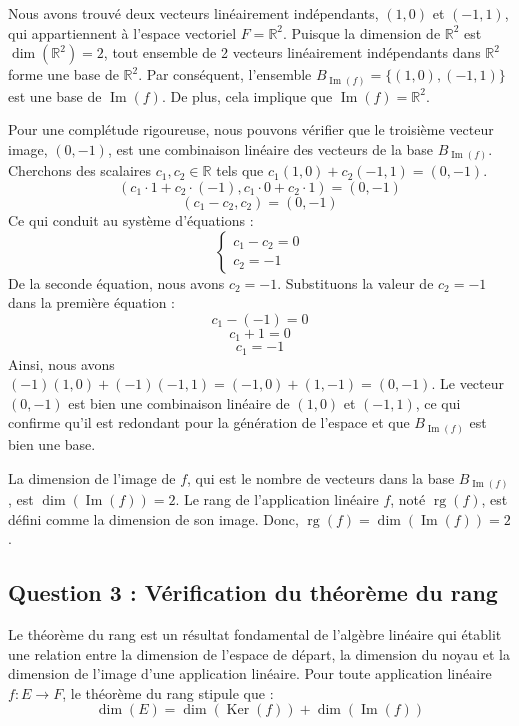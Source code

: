 \documentclass{report}
\begin{document}
Nous avons trouvé deux vecteurs linéairement indépendants, $(1,0)$ et $(-1,1)$, qui appartiennent à l'espace vectoriel $F = \mathbb{R}^2$.
Puisque la dimension de $\mathbb{R}^2$ est $\dim(\mathbb{R}^2) = 2$, tout ensemble de 2 vecteurs linéairement indépendants dans $\mathbb{R}^2$ forme une base de $\mathbb{R}^2$.
Par conséquent, l'ensemble $B_{\operatorname{Im}(f)} = \{ (1,0), (-1,1) \}$ est une base de $\operatorname{Im}(f)$.
De plus, cela implique que $\operatorname{Im}(f) = \mathbb{R}^2$.

Pour une complétude rigoureuse, nous pouvons vérifier que le troisième vecteur image, $(0,-1)$, est une combinaison linéaire des vecteurs de la base $B_{\operatorname{Im}(f)}$.
Cherchons des scalaires $c_1, c_2 \in \mathbb{R}$ tels que $c_1(1,0) + c_2(-1,1) = (0,-1)$.
$$ (c_1 \cdot 1 + c_2 \cdot (-1), c_1 \cdot 0 + c_2 \cdot 1) = (0,-1) $$
$$ (c_1 - c_2, c_2) = (0,-1) $$
Ce qui conduit au système d'équations :
$$ \begin{cases} c_1 - c_2 = 0 \\ c_2 = -1 \end{cases} $$
De la seconde équation, nous avons $c_2 = -1$.
Substituons la valeur de $c_2 = -1$ dans la première équation :
$$ c_1 - (-1) = 0 $$
$$ c_1 + 1 = 0 $$
$$ c_1 = -1 $$
Ainsi, nous avons $(-1)(1,0) + (-1)(-1,1) = (-1,0) + (1,-1) = (0,-1)$.
Le vecteur $(0,-1)$ est bien une combinaison linéaire de $(1,0)$ et $(-1,1)$, ce qui confirme qu'il est redondant pour la génération de l'espace et que $B_{\operatorname{Im}(f)}$ est bien une base.

La dimension de l'image de $f$, qui est le nombre de vecteurs dans la base $B_{\operatorname{Im}(f)}$, est $\dim(\operatorname{Im}(f)) = 2$.
Le rang de l'application linéaire $f$, noté $\operatorname{rg}(f)$, est défini comme la dimension de son image.
Donc, $\operatorname{rg}(f) = \dim(\operatorname{Im}(f)) = 2$.

\subsection*{Question 3 : Vérification du théorème du rang}

Le théorème du rang est un résultat fondamental de l'algèbre linéaire qui établit une relation entre la dimension de l'espace de départ, la dimension du noyau et la dimension de l'image d'une application linéaire.
Pour toute application linéaire $f: E \to F$, le théorème du rang stipule que :
$$ \dim(E) = \dim(\operatorname{Ker}(f)) + \dim(\operatorname{Im}(f)) $$
\end{document}
